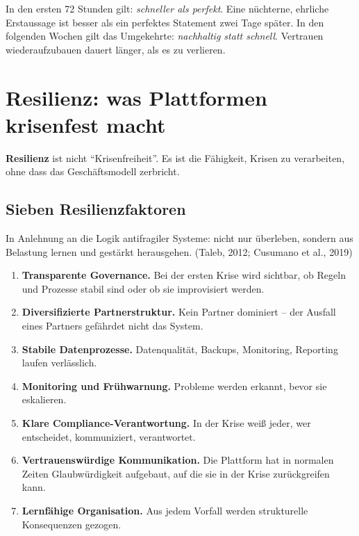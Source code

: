 \documentclass[11pt,a4paper,oneside]{article}
\newcommand{\fachbegriff}[1]{\textbf{#1}}
\newcommand{\quelle}[1]{{\footnotesize\color{lpGray}(#1)}}
\begin{document}
\begin{merkbox}
In den ersten 72 Stunden gilt: \emph{schneller als perfekt}. Eine nüchterne, ehrliche Erstaussage ist besser als ein perfektes Statement zwei Tage später. In den folgenden Wochen gilt das Umgekehrte: \emph{nachhaltig statt schnell}. Vertrauen wiederaufzubauen dauert länger, als es zu verlieren.
\end{merkbox}

\section{Resilienz: was Plattformen krisenfest macht}

\fachbegriff{Resilienz} ist nicht ``Krisenfreiheit''. Es ist die Fähigkeit, Krisen zu verarbeiten, ohne dass das Geschäftsmodell zerbricht.

\subsection{Sieben Resilienzfaktoren}

In Anlehnung an die Logik antifragiler Systeme: nicht nur überleben, sondern aus Belastung lernen und gestärkt herausgehen. \quelle{Taleb, 2012; Cusumano et al., 2019}

\begin{enumerate}
  \item \fachbegriff{Transparente Governance.} Bei der ersten Krise wird sichtbar, ob Regeln und Prozesse stabil sind oder ob sie improvisiert werden.
  \item \fachbegriff{Diversifizierte Partnerstruktur.} Kein Partner dominiert -- der Ausfall eines Partners gefährdet nicht das System.
  \item \fachbegriff{Stabile Datenprozesse.} Datenqualität, Backups, Monitoring, Reporting laufen verlässlich.
  \item \fachbegriff{Monitoring und Frühwarnung.} Probleme werden erkannt, bevor sie eskalieren.
  \item \fachbegriff{Klare Compliance-Verantwortung.} In der Krise weiß jeder, wer entscheidet, kommuniziert, verantwortet.
  \item \fachbegriff{Vertrauenswürdige Kommunikation.} Die Plattform hat in normalen Zeiten Glaubwürdigkeit aufgebaut, auf die sie in der Krise zurückgreifen kann.
  \item \fachbegriff{Lernfähige Organisation.} Aus jedem Vorfall werden strukturelle Konsequenzen gezogen.
\end{enumerate}
\end{document}
